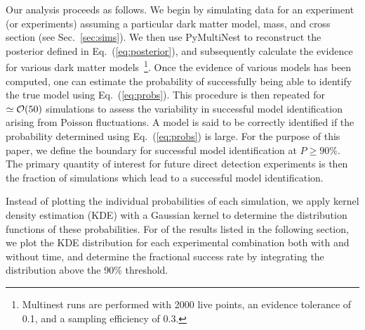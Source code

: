 \documentclass[11pt]{article}
\newcommand{\Eq}[1]{Eq.~(\ref{#1})} \newcommand{\Eqs}[2]{Eqs.~(\ref{#1}) and (\ref{#2})} \newcommand{\Eqm}[2]{Eqs.~(\ref{#1}) through (\ref{#2})}
\begin{document}
Our analysis proceeds as follows. We begin by simulating data for an experiment (or experiments) assuming a particular dark matter model, mass, and cross section (see Sec.~\ref{sec:sims}). We then use PyMultiNest to reconstruct the posterior defined in \Eq{eq:posterior}, and subsequently calculate the evidence for various dark matter models~\cite{pymultinest,Feroz:2008xx}\footnote{Multinest runs are performed with 2000 live points, an evidence tolerance of 0.1, and a sampling efficiency of 0.3.}. Once the evidence of various models has been computed, one can estimate the probability of successfully being able to identify the true model using \Eq{eq:probs}. This procedure is then repeated for $\simeq {\cal O}(50)$ simulations to assess the variability in successful model identification arising from Poisson fluctuations. A model is said to be correctly identified if the probability determined using \Eq{eq:probs} is large. For the purpose of this paper, we define the boundary for successful model identification at $P \geq 90\%$. The primary quantity of interest for future direct detection experiments is then the fraction of simulations which lead to a successful model identification.    



Instead of plotting the individual probabilities of each simulation, we apply kernel density estimation (KDE) with a Gaussian kernel to determine the distribution functions of these probabilities. For of the results listed in the following section, we plot the KDE distribution for each experimental combination both with and without time, and determine the fractional success rate by integrating the distribution above the 90\% threshold. 
\end{document}

